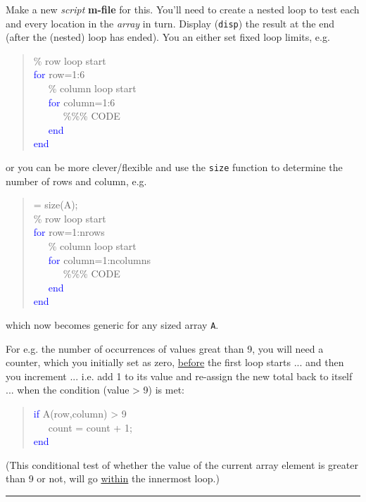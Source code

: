 \documentclass{tufte-book} %
\newenvironment{docspec}{\begin{quotation}\ttfamily\parskip0pt\parindent0pt\ignorespaces}{\end{quotation}}
\begin{document}
Make  a new \textit{script} \textbf{m-file} for this. You'll need to create a nested loop to test each and every location in the \textit{array} in turn. Display (\texttt{disp}) the result at the end (after the (nested) loop has ended). You an either set fixed loop limits, e.g. 
\vspace{-1mm}
\begin{docspec}
\textcolor[rgb]{0,0.501961,0}{\% row loop start\\}
\textcolor{blue}{for} row=1:6\\
\ \ \ \textcolor[rgb]{0,0.501961,0}{\% column loop start\\}
\ \ \ \textcolor{blue}{for} column=1:6\\
\ \ \ \ \ \ \textcolor[rgb]{0,0.501961,0}{\%\%\% CODE}\\
\ \ \ \textcolor{blue}{end}\\
\textcolor{blue}{end}
\end{docspec}
\vspace{-1mm}
or you can be more clever/flexible and use the \texttt{size} function to determine the number of rows and column, e.g.
\vspace{-1mm}
\begin{docspec}
[nrows,ncolumns] = size(A);\\
\textcolor[rgb]{0,0.501961,0}{\% row loop start\\}
\textcolor{blue}{for} row=1:nrows\\
\ \ \ \textcolor[rgb]{0,0.501961,0}{\% column loop start\\}
\ \ \ \textcolor{blue}{for} column=1:ncolumns\\
\ \ \ \ \ \ \textcolor[rgb]{0,0.501961,0}{\%\%\% CODE}\\
\ \ \ \textcolor{blue}{end}\\
\textcolor{blue}{end}
\end{docspec}
\vspace{-1mm}
which now becomes generic for any sized array \texttt{A}.

For e.g. the number of occurrences of values great than 9, you will need a counter, which you initially set as zero, \uline{before} the first loop starts ... and then you increment ... i.e. add 1 to its value and re-assign the new total back to itself ... when the condition (value > 9) is met:
\begin{docspec}
\textcolor{blue}{if} A(row,column) > 9\\
\ \ \ count = count + 1;\\
\textcolor{blue}{end}
\end{docspec}
(This conditional test of whether the value of the current array element is greater than 9 or not, will go \uline{within} the innermost loop.)
\noindent\rule{4cm}{0.5pt}
\end{document}
